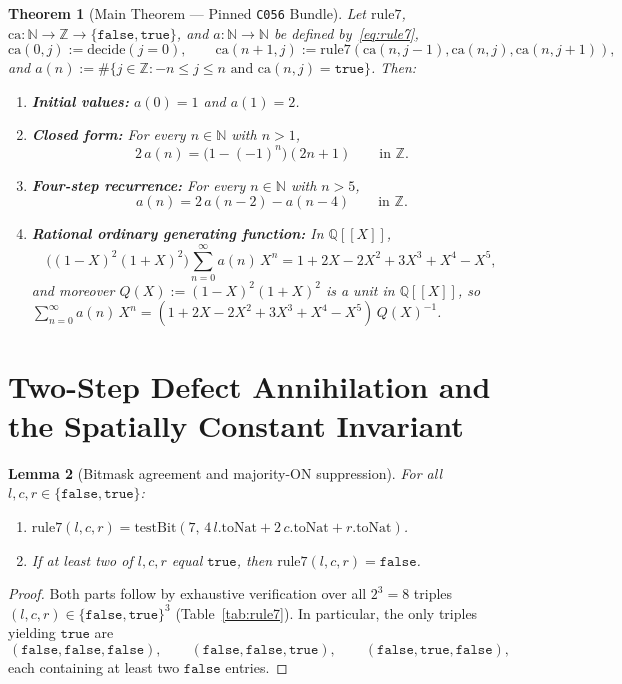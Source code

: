 \documentclass[11pt]{article}
\newcommand{\llbracket}{[\![}
\newcommand{\rrbracket}{]\!]}
\newtheorem{theorem}{Theorem}[section]
\newtheorem{lemma}[theorem]{Lemma}
\theoremstyle{definition}
\newcommand{\N}{\mathbb{N}}
\newcommand{\Z}{\mathbb{Z}}
\newcommand{\Q}{\mathbb{Q}}
\newcommand{\ca}{\mathrm{ca}}
\newcommand{\ruleSeven}{\mathrm{rule7}}
\newcommand{\btrue}{\mathtt{true}}
\newcommand{\bfalse}{\mathtt{false}}
\begin{document}
\begin{theorem}[Main Theorem --- Pinned \texttt{C056} Bundle]
\label{thm:main}
Let $\ruleSeven$, $\ca : \N \to \Z \to \{\bfalse, \btrue\}$, and $a : \N \to \N$ be defined by~\eqref{eq:rule7},
\[
\ca(0, j) := \mathrm{decide}(j = 0), \qquad \ca(n + 1, j) := \ruleSeven(\ca(n, j - 1), \ca(n, j), \ca(n, j + 1)),
\]
and $a(n) := \#\{j \in \Z : -n \le j \le n \text{ and } \ca(n, j) = \btrue\}$. Then:
\begin{enumerate}
\item[\textup{(0)}] \textbf{Initial values:} $a(0) = 1$ and $a(1) = 2$.
\item[\textup{(1)}] \textbf{Closed form:} For every $n \in \N$ with $n > 1$,
\[
2\,a(n) = \bigl(1 - (-1)^n\bigr)(2n + 1) \qquad \text{in } \Z.
\]
\item[\textup{(2)}] \textbf{Four-step recurrence:} For every $n \in \N$ with $n > 5$,
\[
a(n) = 2\,a(n - 2) - a(n - 4) \qquad \text{in } \Z.
\]
\item[\textup{(3)}] \textbf{Rational ordinary generating function:} In $\Q\llbracket X \rrbracket$,
\[
\bigl((1 - X)^2(1 + X)^2\bigr)\sum_{n=0}^{\infty} a(n)\,X^n = 1 + 2X - 2X^2 + 3X^3 + X^4 - X^5,
\]
and moreover $Q(X) := (1 - X)^2(1 + X)^2$ is a unit in $\Q\llbracket X \rrbracket$, so $\sum_{n=0}^{\infty} a(n)\,X^n = (1 + 2X - 2X^2 + 3X^3 + X^4 - X^5)\,Q(X)^{-1}$.
\end{enumerate}
\end{theorem}

\section{Two-Step Defect Annihilation and the Spatially Constant Invariant}

\begin{lemma}[Bitmask agreement and majority-ON suppression]
\label{lem:rule7}
For all $l, c, r \in \{\bfalse, \btrue\}$:
\begin{enumerate}
\item[\textup{(a)}] $\ruleSeven(l, c, r) = \mathrm{testBit}(7,\, 4\,l.\mathrm{toNat} + 2\,c.\mathrm{toNat} + r.\mathrm{toNat})$.
\item[\textup{(b)}] If at least two of $l, c, r$ equal $\btrue$, then $\ruleSeven(l, c, r) = \bfalse$.
\end{enumerate}
\end{lemma}

\begin{proof}
Both parts follow by exhaustive verification over all $2^3 = 8$ triples $(l, c, r) \in \{\bfalse, \btrue\}^3$ (Table~\ref{tab:rule7}). In particular, the only triples yielding $\btrue$ are
\[
(\bfalse, \bfalse, \bfalse), \qquad (\bfalse, \bfalse, \btrue), \qquad (\bfalse, \btrue, \bfalse),
\]
each containing at least two $\bfalse$ entries.
\end{proof}
\end{document}
